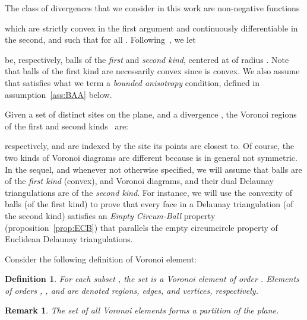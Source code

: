 \documentclass[11pt]{article}
\newtheorem{definition}{Definition}
\newtheorem{remark}{Remark}
\begin{document}
The class of divergences that we consider in this work are non-negative functions 
	 
	which are 	strictly convex in the first argument and continuously differentiable in the second, 
	and such that  for all . 
Following~\cite{Bregman}, we let

be, respectively, balls of the \emph{first} and \emph{second kind}, centered at  of radius . 
Note that balls of the first kind are necessarily convex since  is convex. 
We also assume that  satisfies what we term a \emph{bounded anisotropy} condition, 
	defined in assumption~\ref{ass:BAA} below. 

Given a set  of 
 distinct sites on the plane, and a divergence , 
the Voronoi regions 
of the first and second kinds~\cite{Bregman} are:  

respectively, and are indexed by the site its points are closest to.  
Of course, the two kinds of Voronoi diagrams are different because  is in general not symmetric. 
In the sequel, and whenever not otherwise specified, we will assume that balls are of the \emph{first kind} (convex), 
	and Voronoi diagrams, and their dual Delaunay triangulations are of the \emph{second kind}. 
For instance, we will use the convexity of balls (of the first kind) to prove 
	that every face in a Delaunay triangulation (of the second kind) 
	satisfies an \emph{Empty Circum-Ball} property (proposition~\ref{prop:ECB}) 
	that parallels the empty circumcircle property of Euclidean Delaunay triangulations. 



Consider the following definition of Voronoi element:
\begin{definition}\label{def:VorI}
	For each subset , the set  is a Voronoi element of order . 
Elements of orders , , and  are denoted regions, edges, and vertices, respectively. 
\end{definition}
\begin{remark}
The set of all Voronoi elements  forms a partition of the plane. 
\end{remark}
\end{document}
